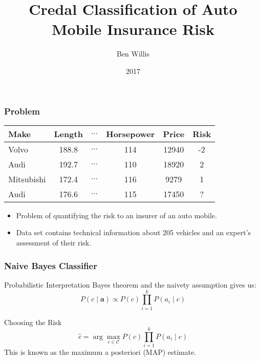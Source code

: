 \documentclass{beamer}
\title{Credal Classification of Auto Mobile Insurance Risk}
\author{Ben Willis}
\institute{Durham University}
\date{2017}
\begin{document}
 
\frame{\titlepage}

\begin{frame}
	\frametitle{Problem}
	\begin{center}
		\begin{tabular}{l c c c c|c}
			Make       & Length & $\dots$ & Horsepower & Price & Risk \\
			\hline
			Volvo      & 188.8  & $\dots$ & 114        & 12940 & -2   \\
			Audi       & 192.7  & $\dots$ & 110        & 18920 & 2    \\
			Mitsubishi & 172.4  & $\dots$ & 116        & 9279  & 1    \\
			Audi       & 176.6  & $\dots$ & 115        & 17450 & ?
		\end{tabular}
	\end{center}
	\begin{itemize}
		\item Problem of quantifying the risk to an insurer of an auto mobile.
		\item Data set contains technical information about 205 vehicles and an expert's assessment of their risk.
	\end{itemize}
\end{frame}

\begin{frame}
	\frametitle{Naive Bayes Classifier}
		\begin{block}{Probabilistic Interpretation}
			Bayes theorem and the naivety assumption gives us:
			\begin{equation}
				P(c \mid \mathbf{a}) \propto P(c)\prod_{i=1}^{k}P(a_i \mid c)
			\end{equation}
		\end{block}
		\begin{block}{Choosing the Risk}
			\begin{equation}
				\hat c = \arg\max_{c \in \mathcal{C}} P(c)\prod_{i=1}^{k}P(a_i \mid c)
			\end{equation}
			This is known as the maximum a posteriori (MAP) estimate.
		\end{block}
\end{frame}
\end{document}
